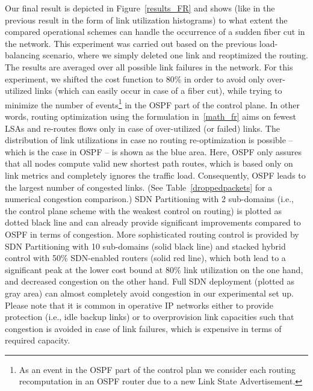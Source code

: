 \documentclass[journal]{IEEEtran}
\begin{document}
Our final result is depicted in Figure~\ref{results_FR} and shows (like in the previous result in the form of link utilization histograms) to what extent the compared operational schemes can handle the occurrence of a sudden fiber cut in the network. This experiment was carried out based on the previous load-balancing scenario, where we simply deleted one link and reoptimized the routing. The results are averaged over all possible link failures in the network. For this experiment, we shifted the cost function to 80\% in order to avoid only over-utilized links (which can easily occur in case of a fiber cut), while trying to minimize the number of events\footnote{As an event in the OSPF part of the control plan we consider each routing recomputation in an OSPF router due to a new Link State Advertisement.} in the OSPF part of the control plane. In other words, routing optimization using the formulation in~\ref{math_fr} aims on fewest LSAs and re-routes flows only in case of over-utilized (or failed) links. The distribution of link utilizations in case no routing re-optimization is possible -- which is the case in OSPF -- is shown as the blue area. Here, OSPF only assures that all nodes compute valid new shortest path routes, which is based only on link metrics and completely ignores the traffic load. Consequently, OSPF leads to the largest number of congested links. (See Table~\ref{droppedpackets} for a numerical congestion comparison.) SDN Partitioning with 2 sub-domains (i.e., the control plane scheme with the weakest control on routing) is plotted as dotted black line and can already provide significant improvements compared to OSPF in terms of congestion. More sophisticated routing control is provided by SDN Partitioning with 10 sub-domains (solid black line) and stacked hybrid control with 50\% SDN-enabled routers (solid red line), which both lead to a significant peak at the lower cost bound at 80\% link utilization on the one hand, and decreased congestion on the other hand. Full SDN deployment (plotted as gray area) can almost completely avoid congestion in our experimental set up. Please note that it is common in operative IP networks either to provide protection (i.e., idle backup links) or to overprovision link capacities such that congestion is avoided in case of link failures, which is expensive in terms of required capacity.
\end{document}
